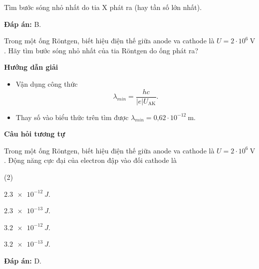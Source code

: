\begin{dang}{Tìm bước sóng nhỏ nhất do tia X phát ra (hay tần số lớn nhất).}
{\textbf{Đáp án:} B.

}
{
Trong một ống R\"ontgen, biết hiệu điện thế giữa anode va cathode là $U = 2\cdot 10^6\ \text{V}$.  Hãy tìm bước sóng nhỏ nhất của tia R\"ontgen do ống phát ra?
}
{\begin{center}
	\textbf{Hướng dẫn giải}
\end{center}
\begin{itemize}
	\item Vận dụng công thức 
	\begin{equation*}
		\lambda_{min}= \dfrac{hc}{	|e|U_{\text{AK}}}.
	\end{equation*}
	\item Thay số vào biểu thức trên tìm được $\lambda_{min}=\text{0,62} \cdot 10^{-12}\ \text{m}$.
\end{itemize}

\begin{center}
\textbf{Câu hỏi tương tự}
\end{center}

Trong một ống R\"ontgen, biết hiệu điện thế giữa anode va cathode là $U = 2\cdot 10^6\ \text{V}$. Động năng cực đại của electron đập vào đối cathode là 
\begin{mcq}(2)
	\item $ \SI{2,3 e-12}{J} $.
	\item $ \SI{2,3 e-13}{J} $.
	\item $ \SI{3,2 e-12}{J} $.
	\item $ \SI{3,2 e-13}{J} $.
\end{mcq}

\textbf{Đáp án:} D.

}

\end{dang}

